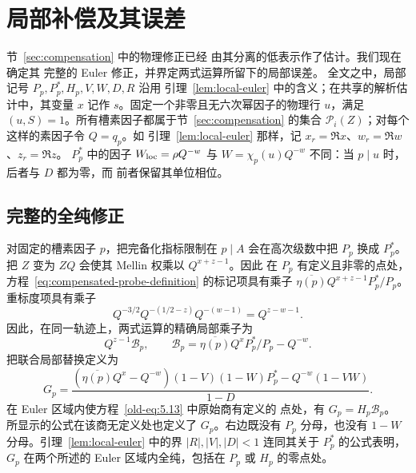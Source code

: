 \section{局部补偿及其误差}
\label{sec:local-compensation}

节~\ref{sec:compensation} 中的物理修正已经
由其分离的低表示作了估计。我们现在确定其
完整的 Euler 修正，并界定两式运算所留下的局部误差。
全文之中，局部记号 $P_p,P_p^*,H_p,V,W,D,R$ 沿用
引理~\ref{lem:local-euler} 中的含义；在共享的解析估计中，其变量
$x$ 记作 $s$。固定一个非零且无六次幂因子的物理行 $u$，满足
$(u,S)=1$。所有槽素因子都属于节~\ref{sec:compensation}
的集合 $\mathcal P_i(Z)$；对每个这样的素因子令 $Q=q_p$。如
引理~\ref{lem:local-euler} 那样，记 $x_r=\Re x$、$w_r=\Re w$、$z_r=\Re z$。
$P_p^*$ 中的因子 $W_{\rm loc}=\rho Q^{-w}$ 与
$W=\chi_p(u)Q^{-w}$ 不同：当 $p\mid u$ 时，后者与 $D$ 都为零，而
前者保留其单位相位。

\subsection{完整的全纯修正}

对固定的槽素因子 $p$，把完备化指标限制在
$p\mid A$ 会在高次级数中把 $P_p$ 换成 $P_p^*$。把
$Z$ 变为 $ZQ$ 会使其 Mellin 权乘以 $Q^{x+z-1}$。因此
在 $P_p$ 有定义且非零的点处，方程~\eqref{eq:compensated-probe-definition}
的标记项具有乘子
$\overline{\eta(p)}Q^{x+z-1}P_p^*/P_p$。重标度项具有乘子
\[
 Q^{-3/2}Q^{-(1/2-z)}Q^{-(w-1)}=Q^{z-w-1}.
\]
因此，在同一轨迹上，两式运算的精确局部乘子为
\begin{equation}\label{old-eq:5.13}
 Q^{z-1}\mathcal B_p,\qquad
 \mathcal B_p=\overline{\eta(p)}Q^xP_p^*/P_p-Q^{-w}.
\end{equation}
把联合局部替换定义为
\begin{equation}\label{old-eq:5.13c}
 G_p=
 \frac{(\overline{\eta(p)}Q^x-Q^{-w})(1-V)(1-W)P_p^*
       -Q^{-w}(1-VW)}{1-D}.
\end{equation}
在 Euler 区域内使方程~\eqref{old-eq:5.13} 中原始商有定义的
点处，有 $G_p=H_p\mathcal B_p$。
所显示的公式在该商无定义处也定义了
$G_p$。右边既没有 $P_p$
分母，也没有 $1-W$ 分母。引理~\ref{lem:local-euler} 中的界 $|R|,|V|,|D|<1$
连同其关于 $P_p^*$ 的公式表明，
$G_p$ 在两个所述的 Euler 区域内全纯，包括在 $P_p$ 或 $H_p$
的零点处。

